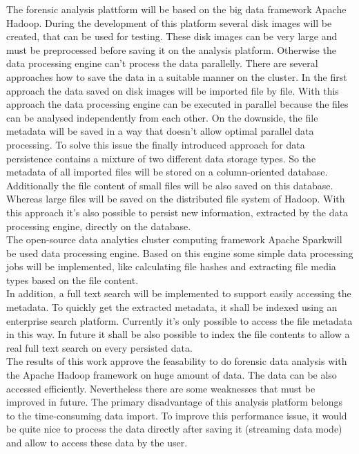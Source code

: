 \noindent
The forensic analysis plattform will be based on the big data framework Apache Hadoop\textsuperscript{\textregistered}. During the development of this platform several disk images will be created, that can be used for testing. These disk images can be very large and must be preprocessed before saving it on the analysis platform. Otherwise the data processing engine can't process the data parallelly. There are several approaches how to save the data in a suitable manner on the cluster. In the first approach the data saved on disk images will be imported file by file. With this approach the data processing engine can be executed in parallel because the files can be analysed independently from each other. On the downside, the file metadata will be saved in a way that doesn't allow optimal parallel data processing. To solve this issue the finally introduced approach for data persistence contains a mixture of two different data storage types. So the metadata of all imported files will be stored on a column-oriented database. Additionally the file content of small files will be also saved on this database. Whereas large files will be saved on the distributed file system of Hadoop. With this approach it's also possible to persist new information, extracted by the data processing engine, directly on the database.\\

\noindent
The open-source data analytics cluster computing framework Apache Spark\texttrademark\thinspace will be used data processing engine. Based on this engine some simple data processing jobs will be implemented, like calculating file hashes and extracting file media types based on the file content.\\
In addition, a full text search will be implemented to support easily accessing the metadata. To quickly get the extracted metadata, it shall be indexed using an enterprise search platform. Currently it's only possible to access the file metadata in this way. In future it shall be also possible to index the file contents to allow a real full text search on every persisted data.\\

\noindent
The results of this work approve the feasability to do forensic data analysis with the Apache Hadoop framework on huge amount of data. The data can be also accessed efficiently. Nevertheless there are some weaknesses that must be improved in future. The primary disadvantage of this analysis platform belongs to the time-consuming data import. To improve this performance issue, it would be quite nice to process the data directly after saving it (streaming data mode) and allow to access these data by the user. 

